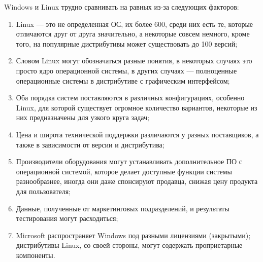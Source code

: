 \documentclass[14pt]{article}
\begin{document}
    Windows и Linux трудно сравнивать на равных из-за следующих факторов:
    \begin{enumerate}
        \item Linux --- это не определенная ОС, их более 600, среди них есть те, которые отличаются друг от друга значительно, а некоторые совсем немного, кроме того, на популярные дистрибутивы может существовать до 100 версий;
        \item Словом Linux могут обозначаться разные понятия, в некоторых случаях это просто ядро операционной системы, в других случаях --- полноценные операционные системы в дистрибутиве с графическим интерфейсом;
        \item Оба порядка систем поставляются в различных конфигурациях, особенно Linux, для которой существует огромное количество вариантов, некоторые из них предназначены для узкого круга задач;
        \item Цена и широта технической поддержки различаются у разных поставщиков, а также в зависимости от версии и дистрибутива;
        \item Производители оборудования могут устанавливать дополнительное ПО с операционной системой, которое делает доступные функции системы разнообразнее, иногда они даже спонсируют продавца, снижая цену продукта для пользователя;
        \item Данные, полученные от маркетинговых подразделений, и результаты тестирования могут расходиться;
        \item Microsoft распространяет Windows под разными лицензиями (закрытыми); дистрибутивы Linux, со своей стороны, могут содержать проприетарные компоненты.
    \end{enumerate}

    \newpage
\end{document}
